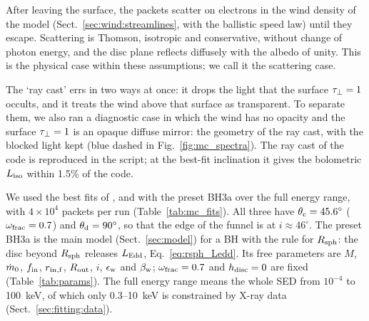 {After leaving the surface,} the packets scatter on electrons in the wind density of the model (Sect.~\ref{sec:wind:streamlines}, with the ballistic speed law) until they escape.
Scattering is Thomson, isotropic and conservative, without change of photon energy, and the disc plane reflects diffusely with the albedo of unity.
This is the physical case within these assumptions{; we call it the scattering case}.

{The `ray cast' errs in two ways at once: it drops the light that the surface $\tau_\perp = 1$ occults, and it treats the wind above that surface as transparent.
To separate them, we also ran a diagnostic case in which the wind has no opacity and the surface $\tau_\perp = 1$ is an opaque diffuse mirror: the geometry of the ray cast, with the blocked light kept (blue dashed in Fig.~\ref{fig:mc_spectra}).}
The ray cast of the code is reproduced in the script; at the best-fit inclination it gives the bolometric $L_{\rm iso}$ within 1.5\% of the code.

We used the best fits of \srcHoIX, \srcNGCthirteen and \srcNGCfiftyfour with the preset BH3a over the full energy range, with $4\times10^4$ packets per run (Table~\ref{tab:mc_fits}).
All three have $\theta_{\rm c} = 45.6^\circ$ ($\omega_{\rm frac} = 0.7$) and $\theta_{\rm d} = 90^\circ$, so that the edge of the funnel is at $i \approx 46^\circ$.
The preset BH3a is the main model (Sect.~\ref{sec:model}) for a BH with the rule  for $R_{\rm sph}$: the disc beyond $R_{\rm sph}$ releases $L_{\rm Edd}$, Eq.~\eqref{eq:rsph_Ledd}.
Its free parameters are $M$, $\dot m_0$, $f_{\rm in}$, $r_{\rm in,f}$, $R_{\rm out}$, $i$, $\epsilon_{\rm w}$ and $\beta_{\rm w}$; $\omega_{\rm frac} = 0.7$ and $h_{\rm disc} = 0$ are fixed (Table~\ref{tab:params}).
The full energy range means the whole SED from $10^{-4}$ to 100~keV, of which only 0.3--10~keV is constrained by X-ray data (Sect.~\ref{sec:fitting:data}).

